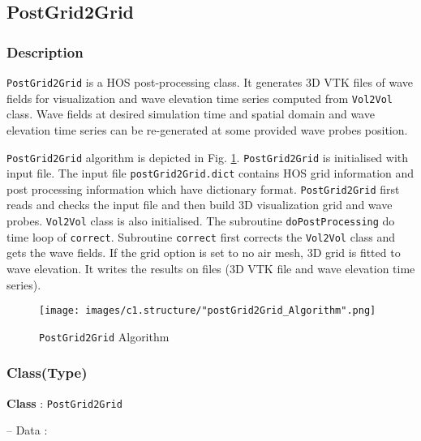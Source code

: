 \pagebreak
	\subsection{PostGrid2Grid}
	
	\label{chap:postGrid2Grid}

	\subsubsection{Description}
	
\texttt{PostGrid2Grid} is a HOS post-processing class. It generates 3D VTK files of wave fields for visualization and wave elevation time series computed from \texttt{Vol2Vol} class. Wave fields at desired simulation time and spatial domain and wave elevation time series can be re-generated at some provided wave probes position. 

\texttt{PostGrid2Grid} algorithm is depicted in Fig. \ref{fig:postGrid2GridAlgorighm}. \texttt{PostGrid2Grid} is initialised with input file. The input file \texttt{postGrid2Grid.dict} contains HOS grid information and post processing information which have dictionary format. \texttt{PostGrid2Grid} first reads and checks the input file and then build 3D visualization grid and wave probes. \texttt{Vol2Vol} class is also initialised. The subroutine \texttt{doPostProcessing} do time loop of \texttt{correct}. Subroutine \texttt{correct} first corrects the \texttt{Vol2Vol} class and gets the wave fields. If the grid option is set to no air mesh, 3D grid is fitted to wave elevation. It writes the results on files (3D VTK file and wave elevation time series).


	\vspace{0.2cm}
	
	{
		\begin{figure} [H]
			\centering
			\texttt{[image: images/c1.structure/"postGrid2Grid\_Algorithm".png]}
			\vspace{0.5cm}
			\caption{\texttt{PostGrid2Grid} Algorithm}
			\label{fig:postGrid2GridAlgorighm}
		\end{figure}
	}	
	
	\pagebreak
	\subsubsection{Class(Type)}	
	
	\textbf{Class} : \texttt{PostGrid2Grid}
	
	\hspace{0.5 cm} -- Data :
	
